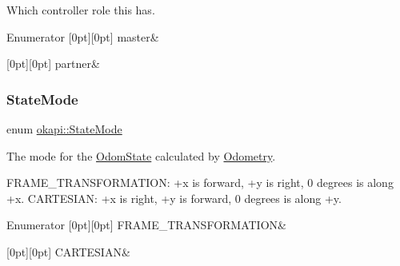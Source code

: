 Which controller role this has. \begin{DoxyEnumFields}{Enumerator}
[0pt][0pt]{}\mbox{\label{namespaceokapi_a56349a0562b06c6ffc742e94cb1e4361aeb0a191797624dd3a48fa681d3061212}} 
master&\\
\hline

[0pt][0pt]{}\mbox{\label{namespaceokapi_a56349a0562b06c6ffc742e94cb1e4361a7454739e907f5595ae61d84b8547f574}} 
partner&\\
\hline

\end{DoxyEnumFields}
\mbox{\label{namespaceokapi_af37fbd761bd859a00ff4dd4a87dd8c07}} 
\subsubsection{\texorpdfstring{StateMode}{StateMode}}
{\footnotesize\ttfamily enum \mbox{\hyperlink{namespaceokapi_af37fbd761bd859a00ff4dd4a87dd8c07}{okapi\+::\+State\+Mode}}\hspace{0.3cm}{\ttfamily [strong]}}

The mode for the \mbox{\hyperlink{structokapi_1_1OdomState}{Odom\+State}} calculated by \mbox{\hyperlink{classokapi_1_1Odometry}{Odometry}}.

{\ttfamily F\+R\+A\+M\+E\+\_\+\+T\+R\+A\+N\+S\+F\+O\+R\+M\+A\+T\+I\+ON}\+: +x is forward, +y is right, 0 degrees is along +x. {\ttfamily C\+A\+R\+T\+E\+S\+I\+AN}\+: +x is right, +y is forward, 0 degrees is along +y. \begin{DoxyEnumFields}{Enumerator}
[0pt][0pt]{}\mbox{\label{namespaceokapi_af37fbd761bd859a00ff4dd4a87dd8c07ad5ed7666e5cebf60d3af20a5a46edf3b}} 
F\+R\+A\+M\+E\+\_\+\+T\+R\+A\+N\+S\+F\+O\+R\+M\+A\+T\+I\+ON&\\
\hline

[0pt][0pt]{}\mbox{\label{namespaceokapi_af37fbd761bd859a00ff4dd4a87dd8c07ac02304094f2866a43251b12946a9a21b}} 
C\+A\+R\+T\+E\+S\+I\+AN&\\
\hline

\end{DoxyEnumFields}


